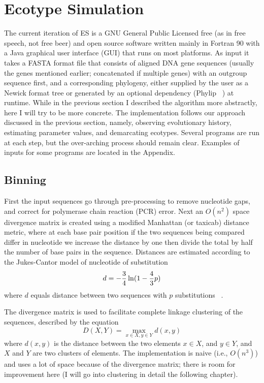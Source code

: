 \section{Ecotype Simulation}
%
%
The current iteration of ES is a GNU General Public Licensed free (as in free speech, not free beer) and open source software written mainly in Fortran 90 with a Java graphical user interface (GUI) that runs on most platforms.
As input it takes a FASTA format file that consists of aligned DNA gene sequences (usually the genes mentioned earlier; concatenated if multiple genes) with an outgroup sequence first, and a corresponding phylogeny, either supplied by the user as a Newick format tree or generated by an optional dependency (Phylip ~\cite{felsenstein1989phylip}) at runtime.
While in the previous section I described the algorithm more abstractly, here I will try to be more concrete.
The implementation follows our approach discussed in the previous section, namely, observing evolutionary history, estimating parameter values, and demarcating ecotypes.
Several programs are run at each step, but the over-arching process should remain clear.
Examples of inputs for some programs are located in the Appendix.

\subsection*{Binning}
First the input sequences go through pre-processing to remove nucleotide gaps, and correct for polymerase chain reaction (PCR) error.
Next an $O(n^2)$ space divergence matrix is created using a modified Manhattan (or taxicab) distance metric, where at each base pair position if the two sequences being compared differ in nucleotide we increase the distance by one then divide the total by half the number of base pairs in the sequence.
Distances are estimated according to the Jukes-Cantor model of nucleotide of substitution$$d=-{3\over4} \ln({1-{4\over3}p})$$where $d$ equals distance between two sequences with $p$ substitutions ~\cite{jukes1969evolution}.

The divergence matrix is used to facilitate complete linkage clustering of the sequences, described by the equation $$D(X,Y)= \max_{x\in X, y\in Y} d(x,y)$$ where $d(x,y)$ is the distance between the two elements $x \in X$, and $y \in Y$, and $X$ and $Y$ are two clusters of elements.
The implementation is naive (i.e., $O(n^3)$) and uses a lot of space because of the divergence matrix; there is room for improvement here (I will go into clustering in detail the following chapter). 


